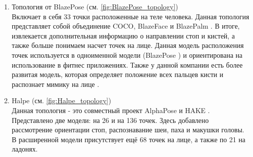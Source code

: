 \begin{enumerate} 
  \item Топология от BlazePose (см. \autoref{fig:BlazePose_topology})\\
  Включает в себя 33 точки расположенные на теле человека. Данная топология представляет собой объединение COCO, BlazeFace \cite{BlazeFace} и BlazePalm \cite{Hands}. В итоге, извлекается дополнительная информацию о направлении стоп и кистей, а также больше понимаем насчет точек на лице. Данная модель расположения точек используется в одноименной модели (BlazePose \cite{BlazePose}) и ориентирована на использование в фитнес приложениях. Также у данной компании есть более развитая модель, которая определяет положение всех пальцев кисти и распознает мимику на лице \cite{Holistic}.
  \item Halpe (см. \autoref{fig:Halpe_topology})\\
  Данная топология - это совместный проект AlphaPose \cite{fang2017rmpe} и HAKE \cite{li2020pastanet}. Представлено две модели: на 26 и на 136 точек. Здесь добавлено рассмотрение ориентации стоп, распознавание шеи, паха и макушки головы. В расширенной модели присутствует ещё 68 точек на лице, а также по 21 на ладонях.
\end{enumerate}

